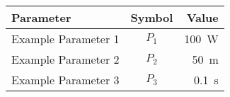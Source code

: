 \documentclass[preview,convert,convert={outext=.png,command=\unexpanded{pdftocairo -r 500 -png \infile}},varwidth=\maxdimen]{standalone}
\begin{document}
\thispagestyle{empty}
\begin{table}[htbp]
    \centering
    \label{tab:exampletable}
    \begin{tabular}{lcr}
        \toprule
        Parameter & Symbol & Value \\
        \midrule
        Example Parameter 1 & $P_1$ & \SI{100}{\watt} \\
        Example Parameter 2 & $P_2$ & \SI{50}{\meter} \\
        Example Parameter 3 & $P_3$ & \SI{0.1}{\second} \\
        \bottomrule
    \end{tabular}
\end{table}
\end{document}
